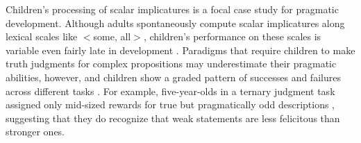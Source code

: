 \documentclass[10pt,letterpaper]{article}
\begin{document}

Children's processing of scalar implicatures is a focal case study for pragmatic development. Although adults spontaneously compute scalar implicatures along lexical scales like $<${\sc some, all}$>$, children's performance on these scales is variable even fairly late in development \cite{noveck2001}.  Paradigms that require children to make truth judgments for complex propositions may underestimate their pragmatic abilities, however, and children show a graded pattern of successes and failures across different tasks \cite{guasti2005,papafragou2003, papafragou2004}. For example, five-year-olds in a ternary judgment task assigned only mid-sized rewards for true but pragmatically odd descriptions \cite{katsos2011}, suggesting that they do recognize that weak statements are less felicitous than stronger ones.  
\end{document}
